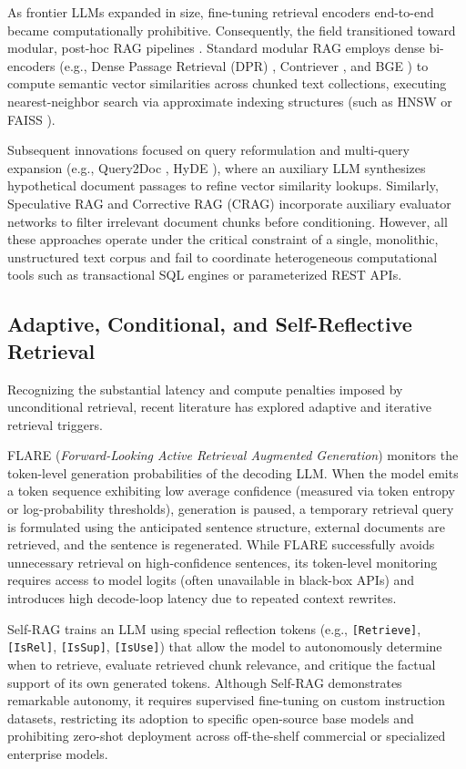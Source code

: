 \documentclass[journal,10pt,twocolumn]{IEEEtran}
\begin{document}
As frontier LLMs expanded in size, fine-tuning retrieval encoders end-to-end became computationally prohibitive. Consequently, the field transitioned toward modular, post-hoc RAG pipelines \cite{gao2023rag_survey}. Standard modular RAG employs dense bi-encoders (e.g., Dense Passage Retrieval (DPR) \cite{karpukhin2020dpr}, Contriever \cite{izacard2021contriever}, and BGE \cite{xiao2023bge}) to compute semantic vector similarities across chunked text collections, executing nearest-neighbor search via approximate indexing structures (such as HNSW \cite{malkov2018hnsw} or FAISS \cite{johnson2019billion}). 

Subsequent innovations focused on query reformulation and multi-query expansion (e.g., Query2Doc \cite{wang2023query2doc}, HyDE \cite{gao2022hyde}), where an auxiliary LLM synthesizes hypothetical document passages to refine vector similarity lookups. Similarly, Speculative RAG \cite{wang2024speculative} and Corrective RAG (CRAG) \cite{yan2024crag} incorporate auxiliary evaluator networks to filter irrelevant document chunks before conditioning. However, all these approaches operate under the critical constraint of a single, monolithic, unstructured text corpus and fail to coordinate heterogeneous computational tools such as transactional SQL engines or parameterized REST APIs.

\subsection{Adaptive, Conditional, and Self-Reflective Retrieval}
Recognizing the substantial latency and compute penalties imposed by unconditional retrieval, recent literature has explored adaptive and iterative retrieval triggers.

FLARE (\textit{Forward-Looking Active Retrieval Augmented Generation}) \cite{jiang2023flare} monitors the token-level generation probabilities of the decoding LLM. When the model emits a token sequence exhibiting low average confidence (measured via token entropy or log-probability thresholds), generation is paused, a temporary retrieval query is formulated using the anticipated sentence structure, external documents are retrieved, and the sentence is regenerated. While FLARE successfully avoids unnecessary retrieval on high-confidence sentences, its token-level monitoring requires access to model logits (often unavailable in black-box APIs) and introduces high decode-loop latency due to repeated context rewrites.

Self-RAG \cite{asai2023selfrag} trains an LLM using special reflection tokens (e.g., \texttt{[Retrieve]}, \texttt{[IsRel]}, \texttt{[IsSup]}, \texttt{[IsUse]}) that allow the model to autonomously determine when to retrieve, evaluate retrieved chunk relevance, and critique the factual support of its own generated tokens. Although Self-RAG demonstrates remarkable autonomy, it requires supervised fine-tuning on custom instruction datasets, restricting its adoption to specific open-source base models and prohibiting zero-shot deployment across off-the-shelf commercial or specialized enterprise models.
\end{document}
